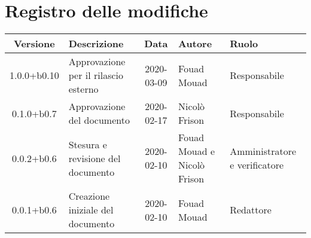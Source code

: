 \section*{Registro delle modifiche}

\begin{center}
	\begin{longtable}{|c|p{3.5cm}|c|p{3cm}|p{3cm}|}
	\hline
	\rowcolor{lighter-grayer}
	\textbf{Versione} & \textbf{Descrizione} & \textbf{Data} & \textbf{Autore} & \textbf{Ruolo} \\
	\hline
	\endfirsthead

	1.0.0+b0.10 & Approvazione per il rilascio esterno & 2020-03-09 & Fouad Mouad & Responsabile \\
	\hline
	0.1.0+b0.7 & Approvazione del documento & 2020-02-17 & Nicolò Frison & Responsabile \\
	\hline
	0.0.2+b0.6 & Stesura e revisione del documento & 2020-02-10 & Fouad Mouad e Nicolò Frison & Amministratore e verificatore \\
	\hline
	0.0.1+b0.6 & Creazione iniziale del documento & 2020-02-10 & Fouad Mouad & Redattore \\
	\hline

	\end{longtable}
\end{center}